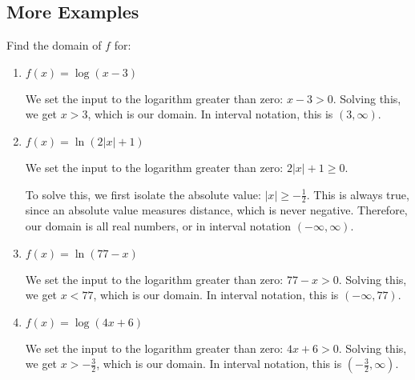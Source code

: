 \documentclass{ximera}
\begin{document}
\subsection{More Examples}
Find the domain of $f$ for:

\begin{enumerate}
	\item $f(x) = \log(x - 3)$
		\begin{explanation}
			\begin{expandable}

We set the input to the logarithm greater than zero: $x - 3 > 0$. Solving this, we get $x > 3$, which is our domain. In interval notation, this is $(3, \infty)$.
			\end{expandable} 
		\end{explanation}
	\item $f(x) = \ln(2|x| + 1)$
		\begin{explanation}
			\begin{expandable}
We set the input to the logarithm greater than zero: $2|x| + 1 \ge 0$.

To solve this, we first isolate the absolute value: $|x| \ge -\frac{1}{2}$. This is always true, since an absolute value measures distance, which is never negative. Therefore, our domain is all real numbers, or in interval notation $(-\infty, \infty)$.
			\end{expandable}
		\end{explanation}
	\item $f(x) = \ln(77 - x)$
		\begin{explanation}
			\begin{expandable}
We set the input to the logarithm greater than zero: $77-x> 0$. Solving this, we get $x < 77$, which is our domain. In interval notation, this is $(-\infty, 77)$.   
			\end{expandable}
		\end{explanation}
	\item $f(x) = \log(4x + 6)$
		\begin{explanation}
			\begin{expandable}
We set the input to the logarithm greater than zero: $4x + 6> 0$. Solving this, we get $x > -\frac{3}{2}$, which is our domain. In interval notation, this is $\left(-\frac{3}{2}, \infty\right)$. 
			\end{expandable}
		\end{explanation}
\end{enumerate}


\end{document}
